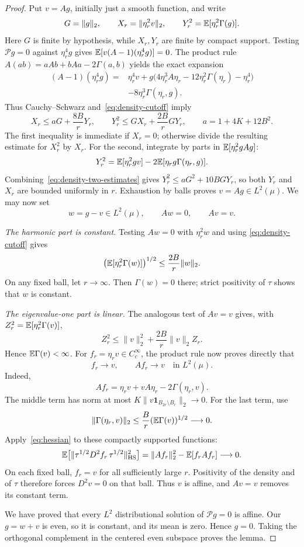 \begin{proof}
Put $v=Ag$, initially just a smooth function, and write
\[
 G=\|g\|_2,\qquad
 X_r=\|\eta_r^2v\|_2,\qquad
 Y_r^2=\mathbb E[\eta_r^2\Gamma(g)].
\]
Here $G$ is finite by hypothesis, while $X_r,Y_r$ are finite by compact
support.
Testing $\mathcal P g=0$ against $\eta_r^4g$ gives
$\mathbb E[v(A-1)(\eta_r^4g)]=0$.
The product rule $A(ab)=aAb+bAa-2\Gamma(a,b)$ yields the exact expansion
\[
 \begin{split}
 (A-1)(\eta_r^4g)
 ={}&\eta_r^4v
 +g\bigl(4\eta_r^3A\eta_r-12\eta_r^2\Gamma(\eta_r)-\eta_r^4\bigr)\\
 &-8\eta_r^3\Gamma(\eta_r,g).
 \end{split}
\]
Thus Cauchy--Schwarz and~\eqref{eq:density-cutoff} imply
\begin{equation}\label{eq:density-two-estimates}
 X_r\le aG+\frac{8B}{r}Y_r,
 \qquad
 Y_r^2\le GX_r+\frac{2B}{r}GY_r,
 \qquad a=1+4K+12B^2.
\end{equation}
The first inequality is immediate if $X_r=0$; otherwise divide the
resulting estimate for $X_r^2$ by $X_r$.  For the second, integrate by
parts in $\mathbb E[\eta_r^2gAg]$:
\[
 Y_r^2=\mathbb E[\eta_r^2gv]-2\mathbb E[\eta_rg\Gamma(\eta_r,g)].
\]
Combining~\eqref{eq:density-two-estimates} gives
$Y_r^2\le aG^2+10BGY_r$, so both $Y_r$ and $X_r$ are bounded uniformly
in $r$.  Exhaustion by balls proves $v=Ag\in L^2(\mu)$.  We may now set
\[
 w=g-v\in L^2(\mu),\qquad Aw=0,\qquad Av=v.
\]

\smallskip
\noindent\emph{The harmonic part is constant.}
Testing $Aw=0$ with $\eta_r^2w$ and using
\eqref{eq:density-cutoff} gives
\[
 \bigl(\mathbb E[\eta_r^2\Gamma(w)]\bigr)^{1/2}
 \le\frac{2B}{r}\|w\|_2.
\]
On any fixed ball, let $r\to\infty$.  Then $\Gamma(w)=0$ there;
strict positivity of $\tau$ shows that $w$ is constant.

\smallskip
\noindent\emph{The eigenvalue-one part is linear.}
The analogous test of $Av=v$ gives, with
$Z_r^2=\mathbb E[\eta_r^2\Gamma(v)]$,
\[
 Z_r^2\le\|v\|_2^2+\frac{2B}{r}\|v\|_2Z_r.
\]
Hence $\mathbb E\Gamma(v)<\infty$.  For $f_r=\eta_rv\in C_c^\infty$,
the product rule now proves directly that
\begin{equation}\label{eq:density-approximation}
 f_r\longrightarrow v,\qquad Af_r\longrightarrow v
 \quad\text{in }L^2(\mu).
\end{equation}
Indeed,
\[
 Af_r=\eta_rv+vA\eta_r-2\Gamma(\eta_r,v).
\]
The middle term has norm at most
$K\|v\mathbf{1}_{B_{2r}\setminus B_r}\|_2\to0$.  For the last term, use
\[
 \|\Gamma(\eta_r,v)\|_2
 \le\frac{B}{r}(\mathbb E\Gamma(v))^{1/2}\longrightarrow0.
\]
Apply~\eqref{eq:hessian} to these compactly supported functions:
\[
 \mathbb E\bigl[\|\tau^{1/2}D^2f_r\,\tau^{1/2}\|_{\mathrm{HS}}^2\bigr]
 =\|Af_r\|_2^2-\mathbb E[f_rAf_r]\longrightarrow0.
\]
On each fixed ball, $f_r=v$ for all sufficiently large $r$.  Positivity
of the density and of $\tau$ therefore forces $D^2v=0$ on that ball.
Thus $v$ is affine, and $Av=v$ removes its constant term.

We have proved that every $L^2$ distributional solution of $\mathcal P g=0$ is
affine.  Our $g=w+v$ is even, so it is constant, and its mean is zero.
Hence $g=0$.  Taking the orthogonal complement in the centered even
subspace proves the lemma.
\end{proof}
